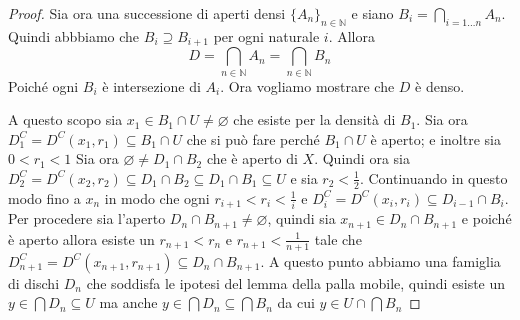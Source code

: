 \begin{proof}
Sia ora una successione di aperti densi \(\{A_n\}_{n \in \mathbb{N}} \) e siano
\(B_{i} = \bigcap_{i = 1\dots n} A_n\). Quindi abbbiamo che \(B_i \supseteq B_{i
+ 1} \) per ogni naturale \(i\). Allora
\[
    D = \bigcap_{n \in \mathbb{N}} A_n = \bigcap_{n \in \mathbb{N}} B_n
\]
Poiché ogni \(B_i\) è intersezione di \(A_i\). Ora vogliamo mostrare che \(D\) è denso.

A questo scopo sia \(x_{1} \in B_{1} \cap U \neq \varnothing\) che esiste per la
densità di \(B_{1}\). Sia ora \(D_{1}^{C} = D^{C}(x_{1}, r_{1}) \subseteq B_{1}
\cap U\) che si può fare perché \(B_{1} \cap U\) è aperto; e inoltre sia \(0 <
r_{1} < 1\) 
Sia ora \(\varnothing \neq D_{1} \cap B_{2}\) che è aperto di \(X\). Quindi ora
sia \(D_{2}^{C} = D^{C}(x_{2}, r_{2}) \subseteq D_{1} \cap B_{2} \subseteq D_{1}
\cap B_{1} \subseteq U \) e sia \(r_{2} < \frac{1}{2}\). Continuando in questo
modo fino a \(x_{n}\) in modo che ogni \(r_{i+1} < r_{i} < \frac{1}{i}\) e
\(D^{C}_i = D^{C}(x_{i}, r_{i}) \subseteq D_{i - 1} \cap B_{i} \). Per procedere
sia l'aperto \(D_n \cap B_{n+1} \neq \varnothing\), quindi sia \(x_{n+1} \in D_n \cap
B_{n+1}\) e poiché è aperto allora esiste un \(r_{n+1} < r_n\) e \(r_{n+1} <
\frac{1}{n+1}\) tale che \(D_{n+1}^{C} = D^{C}(x_{n+1}, r_{n+1}) \subseteq D_n
\cap B_{n+1} \).
A questo punto abbiamo una famiglia di dischi \(D_n\) che soddisfa le ipotesi
del lemma della palla mobile, quindi esiste un \(y \in \bigcap D_n \subseteq U
\) ma anche \(y \in \bigcap D_n \subseteq \bigcap B_n \) da cui \(y \in U \cap \bigcap B_n\) 
\end{proof}

